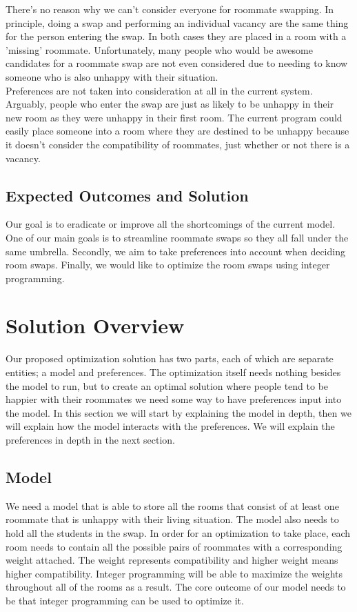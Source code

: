 \documentclass[12pt]{article}
\begin{document}
There's no reason why we can't consider everyone for roommate swapping. In principle, doing a swap and performing an individual vacancy are the same thing for the person entering the swap. In both cases they are placed in a room with a 'missing' roommate. Unfortunately, many people who would be awesome candidates for a roommate swap are not even considered due to needing to know someone who is also unhappy with their situation. \\

Preferences are not taken into consideration at all in the current system. Arguably, people who enter the swap are just as likely to be unhappy in their new room as they were unhappy in their first room. The current program could easily place someone into a room where they are destined to be unhappy because it doesn't consider the compatibility of roommates, just whether or not there is a vacancy. 

\subsection{Expected Outcomes and Solution}
Our goal is to eradicate or improve all the shortcomings of the current model. One of our main goals is to streamline roommate swaps so they all fall under the same umbrella. Secondly, we aim to take preferences into account when deciding room swaps. Finally, we would like to optimize the room swaps using integer programming.

\section{Solution Overview}
Our proposed optimization solution has two parts, each of which are separate entities; a model and preferences. The optimization itself needs nothing besides the model to run, but to create an optimal solution where people tend to be happier with their roommates we need some way to have preferences input into the model. In this section we will start by explaining the model in depth, then we will explain how the model interacts with the preferences. We will explain the preferences in depth in the next section.

\subsection{Model}
We need a model that is able to store all the rooms that consist of at least one roommate that is unhappy with their living situation. The model also needs to hold all the students in the swap. In order for an optimization to take place, each room needs to contain all the possible pairs of roommates with a corresponding weight attached. The weight represents compatibility and higher weight means higher compatibility. Integer programming will be able to maximize the weights throughout all of the rooms as a result. The core outcome of our model needs to be that integer programming can be used to optimize it.
\end{document}

